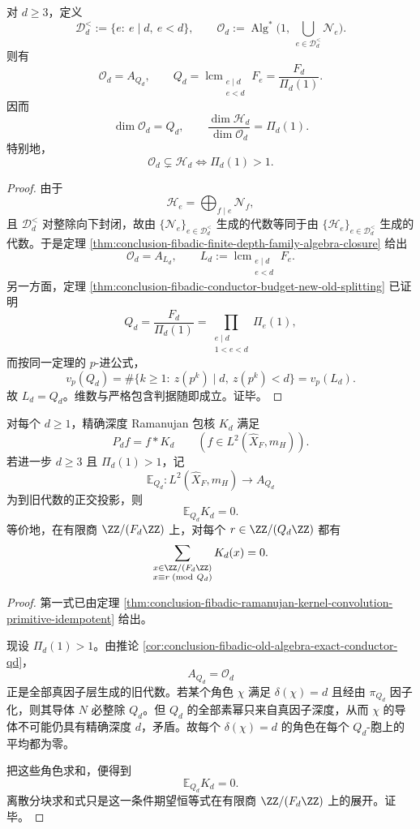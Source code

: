 \begin{corollary}\label{cor:conclusion-fibadic-old-algebra-exact-conductor-qd}
对 \(d\ge 3\)，定义
\[
\mathcal D_d^{<}:=\{e:\ e\mid d,\ e<d\},
\qquad
\mathcal O_d:=\operatorname{Alg}^{*}\!\bigl(1,\ \bigcup_{e\in \mathcal D_d^{<}}\mathcal N_e\bigr).
\]
则有
\[
\mathcal O_d=A_{Q_d},
\qquad
Q_d=\operatorname{lcm}_{\substack{e\mid d\\ e<d}}F_e
=\frac{F_d}{\Pi_d(1)}.
\]
因而
\[
\dim \mathcal O_d=Q_d,
\qquad
\frac{\dim \mathcal H_d}{\dim \mathcal O_d}=\Pi_d(1).
\]
特别地，
\[
\mathcal O_d\subsetneq \mathcal H_d
\iff
\Pi_d(1)>1.
\]
\end{corollary}
\begin{proof}
由于
\[
\mathcal H_e=\bigoplus_{f\mid e}\mathcal N_f,
\]
且 \(\mathcal D_d^{<}\) 对整除向下封闭，故由 \(\{\mathcal N_e\}_{e\in \mathcal D_d^{<}}\) 生成的代数等同于由 \(\{\mathcal H_e\}_{e\in \mathcal D_d^{<}}\) 生成的代数。于是定理 \ref{thm:conclusion-fibadic-finite-depth-family-algebra-closure} 给出
\[
\mathcal O_d=A_{L_d},
\qquad
L_d:=\operatorname{lcm}_{\substack{e\mid d\\ e<d}}F_e.
\]
另一方面，定理 \ref{thm:conclusion-fibadic-conductor-budget-new-old-splitting} 已证明
\[
Q_d=\frac{F_d}{\Pi_d(1)}
=
\prod_{\substack{e\mid d\\ 1<e<d}}\Pi_e(1),
\]
而按同一定理的 \(p\)-进公式，
\[
v_p(Q_d)=\#\{k\ge 1:\ z(p^k)\mid d,\ z(p^k)<d\}
=v_p(L_d).
\]
故 \(L_d=Q_d\)。维数与严格包含判据随即成立。证毕。
\end{proof}

\begin{theorem}\label{thm:conclusion-fibadic-depth-kernel-oldcell-invisibility}
对每个 \(d\ge 1\)，精确深度 Ramanujan 包核 \(K_d\) 满足
\[
P_df=f*K_d
\qquad
(f\in L^2(\widehat X_F,m_H)).
\]
若进一步 \(d\ge 3\) 且 \(\Pi_d(1)>1\)，记
\[
\mathbb E_{Q_d}:L^2(\widehat X_F,m_H)\to A_{Q_d}
\]
为到旧代数的正交投影，则
\[
\mathbb E_{Q_d}K_d=0.
\]
等价地，在有限商 \(\ZZ/(F_d\ZZ)\) 上，对每个 \(r\in \ZZ/(Q_d\ZZ)\) 都有
\[
\sum_{\substack{x\in \ZZ/(F_d\ZZ)\\ x\equiv r\;(\mathrm{mod}\ Q_d)}}K_d(x)=0.
\]
\end{theorem}
\begin{proof}
第一式已由定理 \ref{thm:conclusion-fibadic-ramanujan-kernel-convolution-primitive-idempotent} 给出。

现设 \(\Pi_d(1)>1\)。由推论 \ref{cor:conclusion-fibadic-old-algebra-exact-conductor-qd}，
\[
A_{Q_d}=\mathcal O_d
\]
正是全部真因子层生成的旧代数。若某个角色 \(\chi\) 满足 \(\delta(\chi)=d\) 且经由 \(\pi_{Q_d}\) 因子化，则其导体 \(N\) 必整除 \(Q_d\)。但 \(Q_d\) 的全部素幂只来自真因子深度，从而 \(\chi\) 的导体不可能仍具有精确深度 \(d\)，矛盾。故每个 \(\delta(\chi)=d\) 的角色在每个 \(Q_d\)-胞上的平均都为零。

把这些角色求和，便得到
\[
\mathbb E_{Q_d}K_d=0.
\]
离散分块求和式只是这一条件期望恒等式在有限商 \(\ZZ/(F_d\ZZ)\) 上的展开。证毕。
\end{proof}

